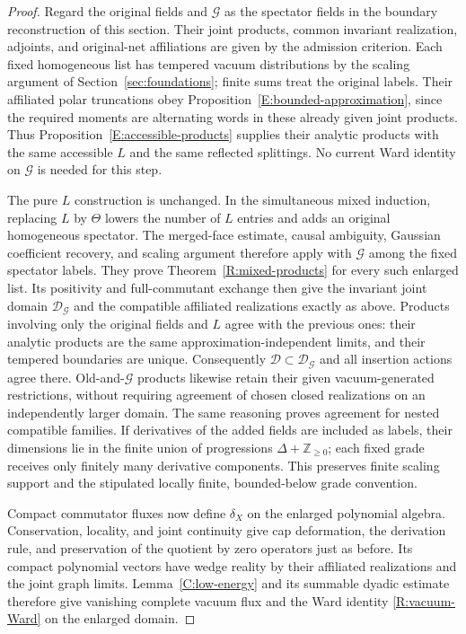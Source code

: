 \begin{proof}
Regard the original fields and $\mathcal G$ as the spectator fields
in the boundary reconstruction of this section.  Their joint products,
common invariant realization, adjoints, and original-net affiliations
are given by the admission criterion.  Each fixed homogeneous list
has tempered vacuum distributions by the scaling argument of
Section~\ref{sec:foundations}; finite sums treat the original labels.
Their affiliated polar truncations obey
Proposition~\ref{E:bounded-approximation}, since the required moments
are alternating words in these already given joint products.  Thus
Proposition~\ref{E:accessible-products} supplies their analytic products
with the same accessible $L$ and the same reflected splittings.
No current Ward identity on $\mathcal G$ is needed for this step.

The pure $L$ construction is unchanged.  In the simultaneous mixed
induction, replacing $L$ by $\Theta$ lowers the number of $L$ entries
and adds an original homogeneous spectator.  The merged-face estimate,
causal ambiguity, Gaussian coefficient recovery, and scaling argument
therefore apply with $\mathcal G$ among the fixed spectator labels.
They prove Theorem~\ref{R:mixed-products} for every such enlarged
list.  Its positivity and full-commutant exchange then give the
invariant joint domain $\mathcal D_{\mathcal G}$ and the compatible
affiliated realizations exactly as above.  Products involving only
the original fields and $L$ agree with the previous ones: their
analytic products are the same approximation-independent limits,
and their tempered boundaries are unique.  Consequently
$\mathcal D\subset\mathcal D_{\mathcal G}$ and all insertion actions
agree there.  Old-and-$\mathcal G$ products likewise retain their
given vacuum-generated restrictions, without requiring agreement
of chosen closed realizations on an independently larger domain.
The same reasoning proves agreement for nested
compatible families.  If derivatives of the added fields are included
as labels, their dimensions lie in the finite union of progressions
$\Delta+\mathbb Z_{\ge0}$; each fixed grade receives only finitely
many derivative components.  This preserves finite scaling support
and the stipulated locally finite, bounded-below grade convention.

Compact commutator fluxes now define $\delta_X$ on the enlarged
polynomial algebra.  Conservation, locality, and joint continuity
give cap deformation, the derivation rule, and preservation of the
quotient by zero operators just as before.  Its compact polynomial
vectors have wedge reality by their affiliated realizations and the
joint graph limits.  Lemma~\ref{C:low-energy} and its summable dyadic
estimate therefore give vanishing complete vacuum flux and the Ward
identity \eqref{R:vacuum-Ward} on the enlarged domain.


\end{proof}
